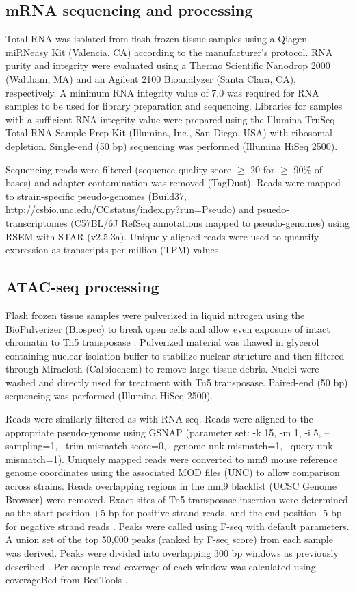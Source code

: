 \documentclass[9pt,twocolumn,twoside]{gsajnl}
\begin{document}
\subsection{mRNA sequencing and processing}

Total RNA was isolated from flash-frozen tissue samples using a Qiagen miRNeasy Kit (Valencia, CA) according to the manufacturer’s protocol. RNA purity and integrity were evaluated using a Thermo Scientific Nanodrop 2000 (Waltham, MA) and an Agilent 2100 Bioanalyzer (Santa Clara, CA), respectively. A minimum RNA integrity value of 7.0 was required for RNA samples to be used for library preparation and sequencing. Libraries for samples with a sufficient RNA integrity value were prepared using the Illumina TruSeq Total RNA Sample Prep Kit (Illumina, Inc., San Diego, USA) with ribosomal depletion. Single-end (50 bp) sequencing was performed (Illumina HiSeq 2500).

Sequencing reads were filtered (sequence quality score $\ge$ 20 for $\ge$ 90\% of bases) and adapter contamination was removed (TagDust). Reads were mapped to strain-specific pseudo-genomes (Build37, \url{http://csbio.unc.edu/CCstatus/index.py?run=Pseudo}) and psuedo-transcriptomes (C57BL/6J RefSeq annotations mapped to pseudo-genomes) using RSEM with STAR (v2.5.3a). Uniquely aligned reads  were used to quantify expression as transcripts per million (TPM) values.

\subsection{ATAC-seq processing}

Flash frozen tissue samples were pulverized in liquid nitrogen using the BioPulverizer (Biospec) to break open cells and allow even exposure of intact chromatin to Tn5 transposase \citep{Buenrostro2015}. Pulverized material was thawed in glycerol containing nuclear isolation buffer to stabilize nuclear structure and then filtered through Miracloth (Calbiochem) to remove large tissue debris. Nuclei were washed and directly used for treatment with Tn5 transposase. Paired-end (50 bp) sequencing was performed (Illumina HiSeq 2500).

Reads were similarly filtered as with RNA-seq. Reads were aligned to the appropriate pseudo-genome using GSNAP (parameter set: -k 15, -m 1, -i 5, –sampling=1, –trim-mismatch-score=0, –genome-unk-mismatch=1, –query-unk-mismatch=1). Uniquely mapped reads were converted to mm9 mouse reference genome coordinates using the associated MOD files (UNC) to allow comparison across strains. Reads overlapping regions in the mm9 blacklist (UCSC Genome Browser) were removed. Exact sites of Tn5 transposase insertion were determined as the start position +5 bp for positive strand reads, and the end position -5 bp for negative strand reads \citep{Buenrostro2013}. Peaks were called using F-seq with default parameters. A union set of the top 50,000 peaks (ranked by F-seq score) from each sample was derived. Peaks were divided into overlapping 300 bp windows as previously described \citep{Shibata2012}. Per sample read coverage of each window was calculated using coverageBed from BedTools \citep{Quinlan2010}.
\end{document}
